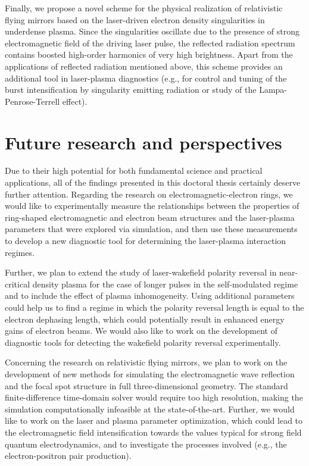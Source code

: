\documentclass[10pt, a4paper, twoside, openright]{report}
\begin{document}
Finally, we propose a novel scheme for the physical realization of relativistic flying mirrors based on the laser-driven electron density singularities in underdense plasma. Since the singularities oscillate due to the presence of strong electromagnetic field of the driving laser pulse, the reflected radiation spectrum contains boosted high-order harmonics of very high brightness. Apart from the applications of reflected radiation mentioned above, this scheme provides an additional tool in laser-plasma diagnostics (e.g., for control and tuning of the burst intensification by singularity emitting radiation or study of the Lampa-Penrose-Terrell effect).

\section{Future research and perspectives}

Due to their high potential for both fundamental science and practical applications, all of the findings presented in this doctoral thesis certainly deserve further attention. Regarding the research on electromagnetic-electron rings, we would like to experimentally measure the relationships between the properties of ring-shaped electromagnetic and electron beam structures and the laser-plasma parameters that were explored via simulation, and then use these measurements to develop a new diagnostic tool for determining the laser-plasma interaction regimes. 

Further, we plan to extend the study of laser-wakefield polarity reversal in near-critical density plasma for the case of longer pulses in the self-modulated regime and to include the effect of plasma inhomogeneity. Using additional parameters could help us to find a regime in which the polarity reversal length is equal to the electron dephasing length, which could potentially result in enhanced energy gains of electron beams. We would also like to work on the development of diagnostic tools for detecting the wakefield polarity reversal experimentally.

Concerning the research on relativistic flying mirrors, we plan to work on the development of new methods for simulating the electromagnetic wave reflection and the focal spot structure in full three-dimensional geometry. The standard finite-difference time-domain solver would require too high resolution, making the simulation computationally infeasible at the state-of-the-art. Further, we would like to work on the laser and plasma parameter optimization, which could lead to the electromagnetic field intensification towards the values typical for strong field quantum electrodynamics, and to investigate the processes involved (e.g., the electron-positron pair production).
\end{document}
